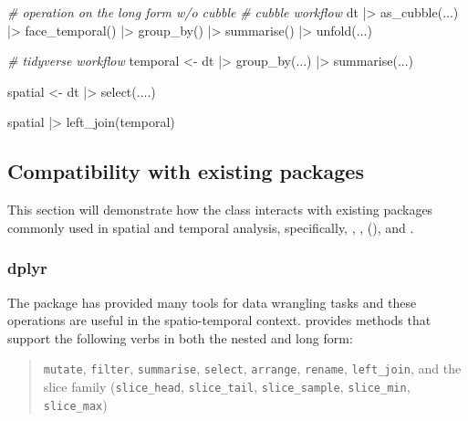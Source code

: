 \documentclass{article}
\newenvironment{Shaded}{\begin{snugshade}}{\end{snugshade}}
\newcommand{\CommentTok}[1]{\textcolor[rgb]{0.56,0.35,0.01}{\textit{#1}}}
\newcommand{\FunctionTok}[1]{\textcolor[rgb]{0.00,0.00,0.00}{#1}}
\newcommand{\NormalTok}[1]{#1}
\newcommand{\OtherTok}[1]{\textcolor[rgb]{0.56,0.35,0.01}{#1}}
\newcommand{\SpecialCharTok}[1]{\textcolor[rgb]{0.00,0.00,0.00}{#1}}
\begin{document}
\begin{Shaded}
\begin{Highlighting}[]
\CommentTok{\# operation on the long form w/o cubble}
\CommentTok{\# cubble workflow}
\NormalTok{dt }\SpecialCharTok{|\textgreater{}}
  \FunctionTok{as\_cubble}\NormalTok{(...) }\SpecialCharTok{|\textgreater{}}
  \FunctionTok{face\_temporal}\NormalTok{() }\SpecialCharTok{|\textgreater{}}
  \FunctionTok{group\_by}\NormalTok{() }\SpecialCharTok{|\textgreater{}}
  \FunctionTok{summarise}\NormalTok{() }\SpecialCharTok{|\textgreater{}}
  \FunctionTok{unfold}\NormalTok{(...)}

\CommentTok{\# tidyverse workflow}
\NormalTok{temporal }\OtherTok{\textless{}{-}}\NormalTok{ dt }\SpecialCharTok{|\textgreater{}}
  \FunctionTok{group\_by}\NormalTok{(...) }\SpecialCharTok{|\textgreater{}}
  \FunctionTok{summarise}\NormalTok{(...)}

\NormalTok{spatial }\OtherTok{\textless{}{-}}\NormalTok{ dt }\SpecialCharTok{|\textgreater{}} \FunctionTok{select}\NormalTok{(....)}

\NormalTok{spatial }\SpecialCharTok{|\textgreater{}} \FunctionTok{left\_join}\NormalTok{(temporal)}
\end{Highlighting}
\end{Shaded}

\hypertarget{compact}{%
\subsection{Compatibility with existing packages}\label{compact}}

This section will demonstrate how the  class interacts with existing packages commonly used in spatial and temporal analysis, specifically, , ,  (), and .

\hypertarget{dplyr}{%
\subsubsection{dplyr}\label{dplyr}}

The  package has provided many tools for data wrangling tasks and these operations are useful in the spatio-temporal context.  provides methods that support the following  verbs in both the nested and long form:

\begin{quote}
\texttt{mutate}, \texttt{filter}, \texttt{summarise}, \texttt{select}, \texttt{arrange}, \texttt{rename}, \texttt{left\_join}, and the slice family (\texttt{slice\_head}, \texttt{slice\_tail}, \texttt{slice\_sample}, \texttt{slice\_min}, \texttt{slice\_max})
\end{quote}
\end{document}
